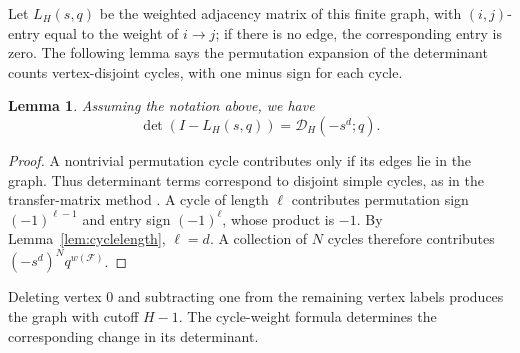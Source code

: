 \documentclass[12pt,reqno]{amsart}
\numberwithin{equation}{section}
\newtheorem{lemma}[theorem]{Lemma}
\theoremstyle{definition}
\theoremstyle{remark}
\theoremstyle{plain}
\newcommand{\Dseries}{\mathscr D}
\begin{document}
Let $L_H(s,q)$ be the weighted adjacency matrix of this finite graph,
with $(i,j)$-entry equal to the weight of $i\to j$; if there is no edge, the corresponding entry is zero.
The following lemma says the permutation expansion of the determinant counts vertex-disjoint
cycles, with one minus sign for each cycle.

\begin{lemma}\label{lem:detpositive} Assuming the notation above, we have
\begin{equation}\label{eq:detpositive}
 \det(I-L_H(s,q))=\Dseries_H(-s^d;q).
\end{equation}
\end{lemma}
\begin{proof}
A nontrivial permutation cycle contributes only if its edges lie in the
graph.  Thus determinant terms correspond to disjoint simple cycles,
as in the transfer-matrix method \cite[Section~4.7]{StanleyEC1}.
A cycle of length $\ell$ contributes permutation sign
$(-1)^{\ell-1}$ and entry sign $(-1)^\ell$, whose product is $-1$.
By Lemma~\ref{lem:cyclelength}, $\ell=d$.
A collection of $N$ cycles therefore contributes
$(-s^d)^Nq^{w(\mathcal F)}$.
\end{proof}

Deleting vertex $0$ and subtracting one from the remaining vertex labels
produces the graph with cutoff $H-1$.  The cycle-weight formula determines
the corresponding change in its determinant.
\end{document}
